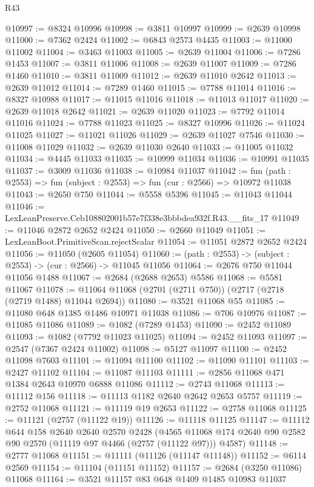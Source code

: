 \begin{lexlean}{R43}
\begin{coremodule}
@10997 := @8324 @10996
@10998 := @3811 @10997
@10999 := @2639 @10998
@11000 := @7362 @2424
@11002 := @6843 @2573 @4435
@11003 := @11000 @11002
@11004 := @3463 @11003
@11005 := @2639 @11004
@11006 := @7286 @1453
@11007 := @3811 @11006
@11008 := @2639 @11007
@11009 := @7286 @1460
@11010 := @3811 @11009
@11012 := @2639 @11010 @2642
@11013 := @2639 @11012
@11014 := @7289 @1460
@11015 := @7788 @11014
@11016 := @8327 @10988
@11017 := @11015 @11016
@11018 := @11013 @11017
@11020 := @2639 @11018 @2642
@11021 := @2639 @11020
@11023 := @7792 @11014 @11016
@11024 := @7788 @11023
@11025 := @8327 @10996
@11026 := @11024 @11025
@11027 := @11021 @11026
@11029 := @2639 @11027 @7546
@11030 := @11008 @11029
@11032 := @2639 @11030 @2640
@11033 := @11005 @11032
@11034 := @4445 @11033
@11035 := @10999 @11034
@11036 := @10991 @11035
@11037 := @3009 @11036
@11038 := @10984 @11037
@11042 := fun (path : @2553) => fun (subject : @2553) => fun (cur : @2566) => @10972 @11038
@11043 := @2650 @750
@11044 := @5558 @5396
@11045 := @11043 @11044
@11046 := LexLeanPreserve.Ceb108802001b57e7f338e3bbbdea932f.R43.__fits_17
@11049 := @11046 @2872 @2652 @2424
@11050 := @2660 @11049
@11051 := LexLeanBoot.PrimitiveScan.rejectScalar
@11054 := @11051 @2872 @2652 @2424
@11056 := @11050 (@2605 @11054)
@11060 := (path : @2553) -> (subject : @2553) -> (cur : @2566) -> @11045 @11056
@11064 := @2676 @750 @11044 @11056 @1488
@11067 := @2684 (@2688 @2653) @5586
@11068 := @5581 @11067
@11078 := @11064 @11068 (@2701 (@2711 @750)) (@2717 (@2718 (@2719 @1488) @11044 @2694))
@11080 := @3521 @11068 @55
@11085 := @11080 @648 @1385 @1486 @10971 @11038
@11086 := @706 @10976
@11087 := @11085 @11086
@11089 := @1082 (@7289 @1453)
@11090 := @2452 @11089
@11093 := @1082 (@7792 @11023 @11025)
@11094 := @2452 @11093
@11097 := @2547 (@7367 @2424 @11002)
@11098 := @5127 @11097
@11100 := @2452 @11098 @7603
@11101 := @11094 @11100
@11102 := @11090 @11101
@11103 := @2427 @11102
@11104 := @11087 @11103
@11111 := @2856 @11068 @471 @1384 @2643 @10970 @6888 @11086
@11112 := @2743 @11068
@11113 := @11112 @156
@11118 := @11113 @1182 @2640 @2642 @2653 @5757
@11119 := @2752 @11068
@11121 := @11119 @19 @2653
@11122 := @2758 @11068
@11125 := @11121 (@2757 (@11122 @19))
@11126 := @11118 @11125
@11147 := @11112
    @644
    @158
    @2640
    @2640
    @2570
    @2428
    (@4565 @11068 @174 @2640 @90 @2582 @90 @2570 (@11119 @97 @4466 (@2757 (@11122 @97))) @4587)
@11148 := @2777 @11068
@11151 := @11111 (@11126 (@11147 @11148))
@11152 := @6114 @2569
@11154 := @11104 (@11151 @11152)
@11157 := @2684 (@3250 @11086) @11068
@11164 := @3521 @11157 @83 @648 @1409 @1485 @10983 @11037

\end{coremodule}
\end{lexlean}
